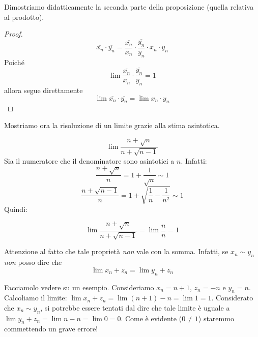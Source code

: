 Dimostriamo didatticamente la seconda parte della proposizione (quella relativa al prodotto).

\begin{proof}
\begin{equation*}
\overline{x_n} \cdot \overline{y_n} = \frac{\overline{x_n}}{x_n} \cdot \frac{\overline{y_n}}{y_n} \cdot x_n \cdot y_n
\end{equation*}
Poiché
\begin{equation*}
\lim \frac{\overline{x_n}}{x_n} \cdot \frac{\overline{y_n}}{y_n} = 1
\end{equation*}
allora segue direttamente
\begin{equation*}
\lim \overline{x_n} \cdot \overline{y_n} = \lim x_n \cdot y_n
\end{equation*}
\end{proof}

Mostriamo ora la risoluzione di un limite grazie alla stima asintotica.

\begin{example}
\begin{equation*}
\lim \frac{n + \sqrt{n}}{n + \sqrt{n-1}}
\end{equation*}
Sia il numeratore che il denominatore sono asintotici a $n$. Infatti:
\begin{equation*}
\frac{n + \sqrt{n}}{n} = 1 + \frac{1}{\sqrt{n}} \sim 1
\end{equation*}
\begin{equation*}
\frac{n + \sqrt{n-1}}{n} = 1 + \sqrt{\frac{1}{n} - \frac{1}{n^2}} \sim 1
\end{equation*}
Quindi:

\begin{equation*}
\lim \frac{n + \sqrt{n}}{n + \sqrt{n-1}} = \lim \frac{n}{n} = 1
\end{equation*}
\end{example}

\begin{remark}
Attenzione al fatto che tale proprietà \emph{non} vale con la somma. Infatti, se $x_n \sim y_n$ \emph{non} posso dire che 
\begin{equation*}
\lim x_n + z_n  = \lim y_n + z_n
\end{equation*}
\end{remark}

Facciamolo vedere su un esempio. Consideriamo $x_n = n + 1$, $z_n = -n$ e $y_n = n$. Calcoliamo il limite: $\lim x_n + z_n = \lim (n + 1) - n = \lim 1 = 1$. Considerato che $x_n \sim y_n$, si potrebbe essere tentati dal dire che tale limite è uguale a $\lim y_n + z_n = \lim n - n = \lim 0 = 0$. Come è evidente ($0 \neq 1$) staremmo commettendo un grave errore!


